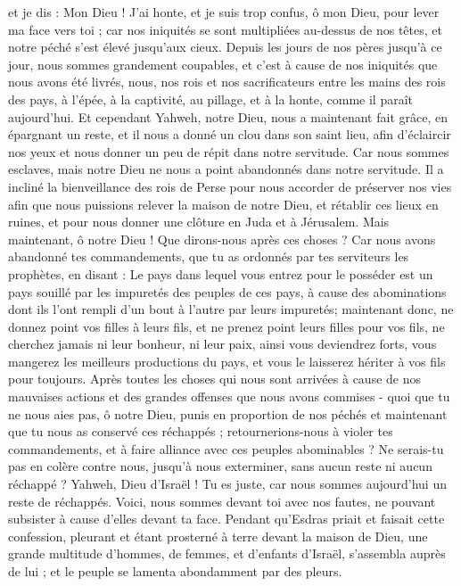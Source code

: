 \begin{multicols}{2}
et je dis : Mon Dieu ! J’ai honte, et je suis trop confus, ô mon Dieu, pour lever ma face vers toi ; car nos iniquités se sont multipliées au-dessus de nos têtes, et notre péché s'est élevé jusqu’aux cieux.
Depuis les jours de nos pères jusqu'à ce jour, nous sommes grandement coupables, et c’est à cause de nos iniquités que nous avons été livrés, nous, nos rois et nos sacrificateurs entre les mains des rois des pays, à l'épée, à la captivité, au pillage, et à la honte, comme il paraît aujourd'hui.
Et cependant Yahweh, notre Dieu, nous a maintenant fait grâce, en épargnant un reste, et il nous a donné un clou dans son saint lieu, afin d'éclaircir nos yeux et nous donner un peu de répit dans notre servitude.
Car nous sommes esclaves, mais notre Dieu ne nous a point abandonnés dans notre servitude. Il a incliné la bienveillance des rois de Perse pour nous accorder de préserver nos vies afin que nous puissions relever la maison de notre Dieu, et rétablir ces lieux en ruines, et pour nous donner une clôture en Juda et à Jérusalem.
Mais maintenant, ô notre Dieu ! Que dirons-nous après ces choses ? Car nous avons abandonné tes commandements,
que tu as ordonnés par tes serviteurs les prophètes, en disant : Le pays dans lequel vous entrez pour le posséder est un pays souillé par les impuretés des peuples de ces pays, à cause des abominations dont ils l'ont rempli d’un bout à l'autre par leurs impuretés;
maintenant donc, ne donnez point vos filles à leurs fils, et ne prenez point leurs filles pour vos fils, ne cherchez jamais ni leur bonheur, ni leur paix, ainsi vous deviendrez forts,  vous mangerez les meilleurs productions du pays, et vous le laisserez hériter à vos fils pour toujours.
Après toutes les choses qui nous sont arrivées à cause de nos mauvaises actions et des grandes offenses que nous avons commises - quoi que tu ne nous aies pas, ô notre Dieu, punis en proportion de nos péchés et maintenant que  tu nous as conservé ces réchappés ; 
retournerions-nous à violer tes commandements, et à faire alliance avec ces peuples abominables ? Ne serais-tu pas en colère contre nous, jusqu'à nous exterminer, sans aucun reste ni aucun réchappé ?
Yahweh, Dieu d'Israël ! Tu es juste, car nous sommes aujourd'hui un reste de réchappés. Voici, nous sommes devant toi avec nos fautes, ne pouvant subsister à cause d’elles devant ta face.
\VerseOne{}Pendant qu’Esdras priait et faisait cette confession, pleurant et étant prosterné à terre devant la maison de Dieu, une grande multitude d'hommes, de femmes, et d’enfants d'Israël, s'assembla auprès de lui ; et le peuple se lamenta abondamment par des pleurs.

\end{multicols}
